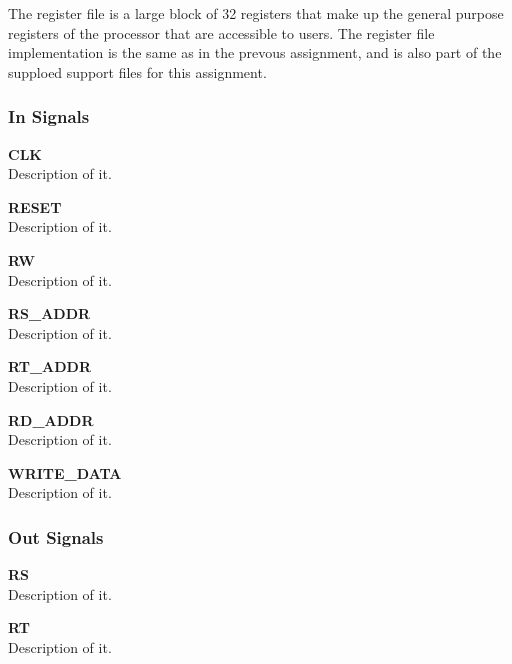 The register file is a large block of 32 registers that make up the general purpose registers of the processor that are accessible to users.
The register file implementation is the same as in the prevous assignment\cn, and is also part of the supploed support files for this assignment\cn.

\subsubsection{In Signals}

\begin{description}
\item{\textbf{CLK}} \\
Description of it.
\item{\textbf{RESET}} \\
Description of it.
\item{\textbf{RW}} \\
Description of it.
\item{\textbf{RS\_ADDR}} \\
Description of it.
\item{\textbf{RT\_ADDR}} \\
Description of it.
\item{\textbf{RD\_ADDR}} \\
Description of it.
\item{\textbf{WRITE\_DATA}} \\
Description of it.
\end{description}

\subsubsection{Out Signals}

\begin{description}
\item{\textbf{RS}} \\
Description of it.
\item{\textbf{RT}} \\
Description of it.
\end{description}

